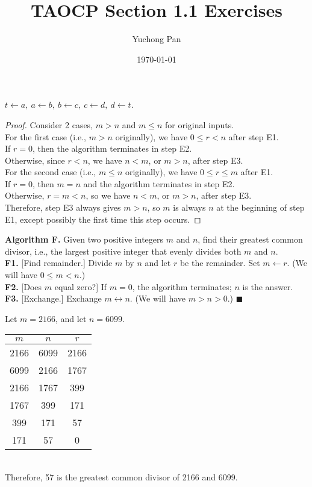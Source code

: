 \documentclass[letterpaper, reqno,11pt]{article}
\begin{document}
\title{TAOCP Section 1.1 Exercises}
\author{Yuchong Pan}
\date{\today}
\newtheorem{thm}{Theorem}
\newtheorem{lemma}{Lemma}
\newcommand{\algo}[2]{{\bf Algorithm #1.} #2}
\newcommand{\algostep}[3]{{\bf #1.} [#2] #3}
\newcommand{\algoend}[0]{$\blacksquare$}
\maketitle
%

 $t\leftarrow a,\ a\leftarrow b,\ b\leftarrow c,\ c\leftarrow d,\ d\leftarrow t$.

\medskip

\begin{proof}
    Consider 2 cases, $m>n$ and $m\leq n$ for original inputs. \\
    For the first case (i.e., $m>n$ originally), we have $0\leq r<n$ after step E1. \\
    If $r=0$, then the algorithm terminates in step E2. \\
    Otherwise, since $r<n$, we have $n<m$, or $m>n$, after step E3. \\
    For the second case (i.e., $m\leq n$ originally), we have $0\leq r\leq m$ after E1. \\
    If $r=0$, then $m=n$ and the algorithm terminates in step E2. \\
    Otherwise, $r=m<n$, so we have $n<m$, or $m>n$, after step E3. \\
    Therefore, step E3 always gives $m>n$, so $m$ is always $n$ at the beginning of step E1, except possibly the first time this step occurs.
\end{proof}

\medskip

\algo{F}{Given two positive integers $m$ and $n$, find their greatest common divisor, i.e., the largest positive integer that evenly divides both $m$ and $n$.} \\
\algostep{F1}{Find remainder.}{Divide $m$ by $n$ and let $r$ be the remainder. Set $m\leftarrow r$. (We will have $0\leq m<n$.)} \\
\algostep{F2}{Does $m$ equal zero?}{If $m=0$, the algorithm terminates; $n$ is the answer.} \\
\algostep{F3}{Exchange.}{Exchange $m\leftrightarrow n$. (We will have $m>n>0$.)} \algoend \\

\medskip

 Let $m=2166$, and let $n=6099$. \\
\begin{tabular}{c c c}
    $m$ & $n$ & $r$ \\
    \hline
    2166 & 6099 & 2166 \\
    6099 & 2166 & 1767 \\
    2166 & 1767 & 399 \\
    1767 & 399 & 171 \\
    399 & 171 & 57 \\
    171 & 57 & 0
\end{tabular} \\
Therefore, 57 is the greatest common divisor of 2166 and 6099.
\end{document}
